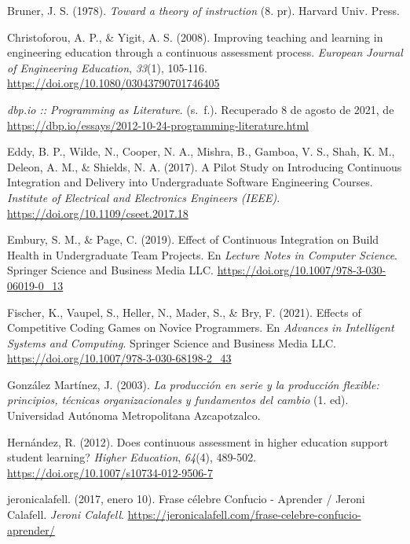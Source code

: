 \documentclass[
  12,
]{scrartcl}
\newlength{\cslhangindent}
\newlength{\cslentryspacingunit} %
\newenvironment{CSLReferences}[2] %
 {%
  \setlength{\parindent}{0pt}
  \ifodd #1
  \let\oldpar\par
  \def\par{\hangindent=\cslhangindent\oldpar}
  \fi
  \setlength{\parskip}{#2\cslentryspacingunit}
 }%
 {}
\begin{document}
\begin{CSLReferences}{1}{0}
\leavevmode\hypertarget{ref-mzz5Yp9s}{}%
Bruner, J. S. (1978). \emph{Toward a theory of instruction} (8. pr).
Harvard Univ. Press.

\leavevmode\hypertarget{ref-GaqreT3v}{}%
Christoforou, A. P., \& Yigit, A. S. (2008). Improving teaching and
learning in engineering education through a continuous assessment
process. \emph{European Journal of Engineering Education}, \emph{33}(1),
105-116. \url{https://doi.org/10.1080/03043790701746405}

\leavevmode\hypertarget{ref-duUamzUT}{}%
\emph{dbp.io :: Programming as Literature}. (s.~f.). Recuperado 8 de
agosto de 2021, de
\url{https://dbp.io/essays/2012-10-24-programming-literature.html}

\leavevmode\hypertarget{ref-an6jVpNC}{}%
Eddy, B. P., Wilde, N., Cooper, N. A., Mishra, B., Gamboa, V. S., Shah,
K. M., Deleon, A. M., \& Shields, N. A. (2017). A Pilot Study on
Introducing Continuous Integration and Delivery into Undergraduate
Software Engineering Courses. \emph{Institute of Electrical and
Electronics Engineers (IEEE)}.
\url{https://doi.org/10.1109/cseet.2017.18}

\leavevmode\hypertarget{ref-15VxjIHpR}{}%
Embury, S. M., \& Page, C. (2019). Effect of Continuous Integration on
Build Health in Undergraduate Team Projects. En \emph{Lecture Notes in
Computer Science}. Springer Science and Business Media LLC.
\url{https://doi.org/10.1007/978-3-030-06019-0_13}

\leavevmode\hypertarget{ref-jC7uBQxN}{}%
Fischer, K., Vaupel, S., Heller, N., Mader, S., \& Bry, F. (2021).
Effects of Competitive Coding Games on Novice Programmers. En
\emph{Advances in Intelligent Systems and Computing}. Springer Science
and Business Media LLC.
\url{https://doi.org/10.1007/978-3-030-68198-2_43}

\leavevmode\hypertarget{ref-L7gjhE6x}{}%
González Martínez, J. (2003). \emph{La producción en serie y la
producción flexible: principios, técnicas organizacionales y fundamentos
del cambio} (1. ed). Universidad Autónoma Metropolitana Azcapotzalco.

\leavevmode\hypertarget{ref-10CD5GUrI}{}%
Hernández, R. (2012). Does continuous assessment in higher education
support student learning? \emph{Higher Education}, \emph{64}(4),
489-502. \url{https://doi.org/10.1007/s10734-012-9506-7}

\leavevmode\hypertarget{ref-6qRfarph}{}%
jeronicalafell. (2017, enero 10). Frase célebre Confucio - Aprender /
Jeroni Calafell. \emph{Jeroni Calafell}.
\url{https://jeronicalafell.com/frase-celebre-confucio-aprender/}


\end{CSLReferences}
\end{document}
